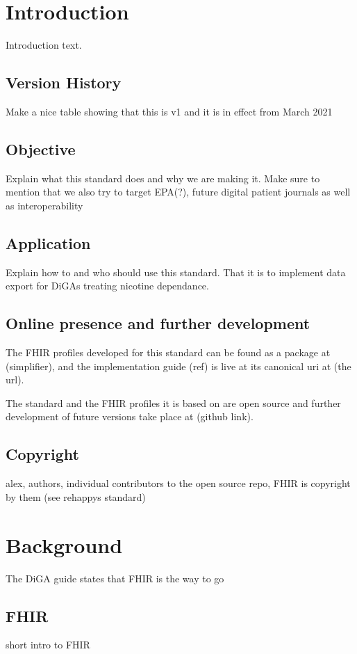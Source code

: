 \documentclass[12px]{report}
\begin{document}
\chapter{Introduction}
\label{ch:intro}

Introduction text.

\section{Version History}
Make a nice table showing that this is v1 and it is in effect from March 2021

\section{Objective}
Explain what this standard does and why we are making it. Make sure to mention that we also try to target EPA(?), future digital patient journals as well as interoperability

\section{Application}
Explain how to and who should use this standard. That it is to implement data export for DiGAs treating nicotine dependance.

\section{Online presence and further development}
The FHIR profiles developed for this standard can be found as a package at (simplifier), and the implementation guide (ref) is live at its canonical uri at (the url).

The standard and the FHIR profiles it is based on are open source and further development of future versions take place at (github link).

\section{Copyright}
alex, authors, individual contributors to the open source repo, FHIR is copyright by them (see rehappys standard)

\chapter{Background}

The DiGA guide states that FHIR is the way to go

\section{FHIR}
short intro to FHIR
\end{document}

